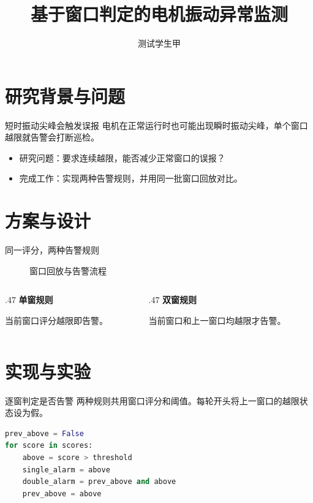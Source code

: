 \documentclass{sdjuslides}
\title[电机振动异常监测]{基于窗口判定的电机振动异常监测}
\author{测试学生甲}
\begin{document}
\makecover
\sdjutableofcontents

\section{研究背景与问题}
\begin{frame}{短时振动尖峰会触发误报}
  电机在正常运行时也可能出现瞬时振动尖峰，单个窗口越限就告警会打断巡检。
  \medskip
  \begin{itemize}
    \item 研究问题：要求连续越限，能否减少正常窗口的误报？
    \item 完成工作：实现两种告警规则，并用同一批窗口回放对比。
  \end{itemize}
\end{frame}

\section{方案与设计}
\begin{frame}{同一评分，两种告警规则}
  \begin{figure}
    \centering
    
    \caption{窗口回放与告警流程}
  \end{figure}
  \begin{columns}[T,onlytextwidth]
    \begin{column}{.47\textwidth}
      \textbf{单窗规则}\par
      当前窗口评分越限即告警。
    \end{column}
    \begin{column}{.47\textwidth}
      \textbf{双窗规则}\par
      当前窗口和上一窗口均越限才告警。
    \end{column}
  \end{columns}
\end{frame}

\section{实现与实验}
\begin{frame}[fragile]{逐窗判定是否告警}
  两种规则共用窗口评分和阈值。每轮开头将上一窗口的越限状态设为假。
  \medskip
  \begin{lstlisting}[language=Python]
prev_above = False
for score in scores:
    above = score > threshold
    single_alarm = above
    double_alarm = prev_above and above
    prev_above = above
  \end{lstlisting}
\end{frame}
\end{document}
